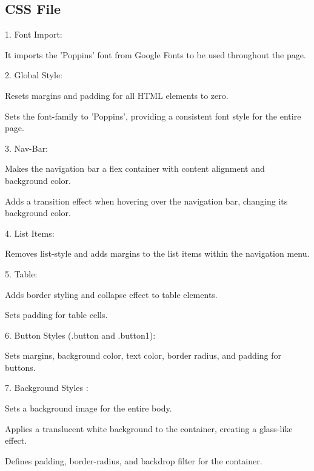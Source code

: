 \documentclass{article}
\begin{document}
\subsection{CSS File}

\begin{itemsize}

1. Font Import:
 \item It imports the 'Poppins' font from Google Fonts to be used throughout the page.


2. Global Style:
 \item Resets margins and padding for all HTML elements to zero.
 \item Sets the font-family to 'Poppins', providing a consistent font style for the entire page.

3. Nav-Bar:

 \item Makes the navigation bar a flex container with content alignment and background color.
 \item Adds a transition effect when hovering over the navigation bar, changing its background color.

4. List Items:

 \item Removes list-style and adds margins to the list items within the navigation menu.

5. Table:
 \item Adds border styling and collapse effect to table elements.
 \item Sets padding for table cells.

6. Button Styles (.button and .button1):
  \item Sets margins, background color, text color, border radius, and padding for buttons.

7. Background Styles :
 \item Sets a background image for the entire body.
 \item Applies a translucent white background to the container, creating a glass-like effect.
 \item Defines padding, border-radius, and backdrop filter for the container.

\end{itemsize}
\end{document}
